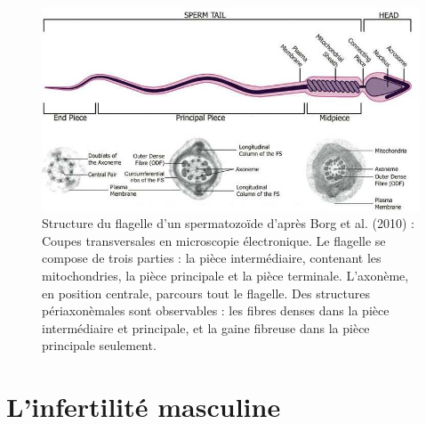 \documentclass[12pt,twoside]{ugathesis}
\theoremstyle{definition}
\theoremstyle{definition}
\theoremstyle{remark}
\begin{document}
\begin{figure}

{\centering \includegraphics[scale=.55]{figure/sperm2} 

}

\caption[Structure du flagelle d’un spermatozoïde]{Structure du flagelle d’un spermatozoïde d'après Borg et al. (2010) : Coupes transversales en microscopie électronique. Le flagelle se compose de trois parties : la pièce intermédiaire, contenant les mitochondries, la pièce principale et la pièce terminale. L’axonème, en position centrale, parcours tout le flagelle. Des structures périaxonèmales sont observables : les fibres denses dans la pièce intermédiaire et principale, et la gaine fibreuse dans la pièce principale seulement.}\label{fig:flagelle}
\end{figure}

\newpage

\section{L'infertilité masculine}\label{linfertilite-masculine}
\end{document}
